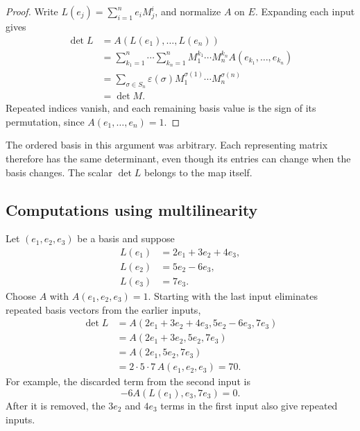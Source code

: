 \begin{proof}
  Write \(L(e_j)=\sum_{i=1}^n e_iM^i_j\), and normalize \(A\) on \(E\).
  Expanding each input gives
  \begin{align*}
    \det L
      &=A(L(e_1),\ldots,L(e_n))\\
      &=\sum_{k_1=1}^n\cdots\sum_{k_n=1}^n
        M^{k_1}_1\cdots M^{k_n}_n A(e_{k_1},\ldots,e_{k_n})\\
      &=\sum_{\sigma\in S_n}\varepsilon(\sigma)
        M^{\sigma(1)}_1\cdots M^{\sigma(n)}_n\\
      &=\det M.
  \end{align*}
  Repeated indices vanish, and each remaining basis value is the sign
  of its permutation, since \(A(e_1,\ldots,e_n)=1\).
\end{proof}

The ordered basis in this argument was arbitrary. Each representing matrix
therefore has the same determinant, even though its entries can change
when the basis changes. The scalar \(\det L\) belongs to the map itself.

\subsection{Computations using multilinearity}

\begin{example}
  \label{ex:linear-algebra-i:triangular-endomorphism-determinant}
  Let \((e_1,e_2,e_3)\) be a basis and suppose
  \[
    \begin{aligned}
      L(e_1)&=2e_1+3e_2+4e_3,\\
      L(e_2)&=5e_2-6e_3,\\
      L(e_3)&=7e_3.
    \end{aligned}
  \]
  Choose \(A\) with \(A(e_1,e_2,e_3)=1\). Starting with the last
  input eliminates repeated basis vectors from the earlier inputs,
  \begin{align*}
    \det L
      &=A(2e_1+3e_2+4e_3,5e_2-6e_3,7e_3)\\
      &=A(2e_1+3e_2,5e_2,7e_3)\\
      &=A(2e_1,5e_2,7e_3)\\
      &=2\cdot5\cdot7\,A(e_1,e_2,e_3)=70.
  \end{align*}
  For example, the discarded term from the second input is
  \[
    -6A(L(e_1),e_3,7e_3)=0.
  \]
  After it is removed, the \(3e_2\)
  and \(4e_3\) terms in the first input also give repeated inputs.
\end{example}

